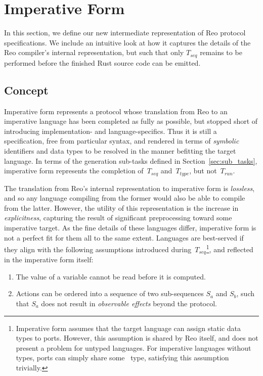 \section{Imperative Form}
\label{sec:imperative_form_sec}
In this section, we define our new intermediate representation of Reo protocol specifications. We include an intuitive look at how it captures the details of the Reo compiler's internal representation, but such that only $T_{seq}$ remains to be performed before the finished Rust source code can be emitted.


\subsection{Concept}
Imperative form represents a protocol whose translation from Reo to an imperative language has been completed as fully as possible, but stopped short of introducing implementation- and language-specifics. Thus it is still a specification, free from particular syntax, and rendered in terms of \textit{symbolic} identifiers and data types to be resolved in the manner befitting the target language. In terms of the generation sub-tasks defined in Section~\ref{sec:sub_tasks}, imperative form represents the completion of~$T_{seq}$ and~$T_{type}$, but not~$T_{run}$.

The translation from Reo's internal representation to imperative form is \textit{lossless}, and so any language compiling from the former would also be able to compile from the latter. However, the utility of this representation is the increase in \textit{explicitness}, capturing the result of significant preprocessing toward some imperative target. As the fine details of these languages differ, imperative form is not a perfect fit for them all to the same extent. Languages are best-served if they align with the following assumptions introduced during~$T_{seq}$\footnote{Imperative form assumes that the target language can assign static data types to ports. However, this assumption is shared by Reo itself, and does not present a problem for untyped languages. For imperative languages without types, ports can simply share some~ type, satisfying this assumption trivially.}, and reflected in the imperative form itself:
\begin{enumerate}
\item The value of a variable cannot be read before it is computed.
\item Actions can be ordered into a sequence of two sub-sequences $S_a$ and $S_b$, such that $S_a$ does not result in \textit{observable effects} beyond the protocol.
\end{enumerate}

